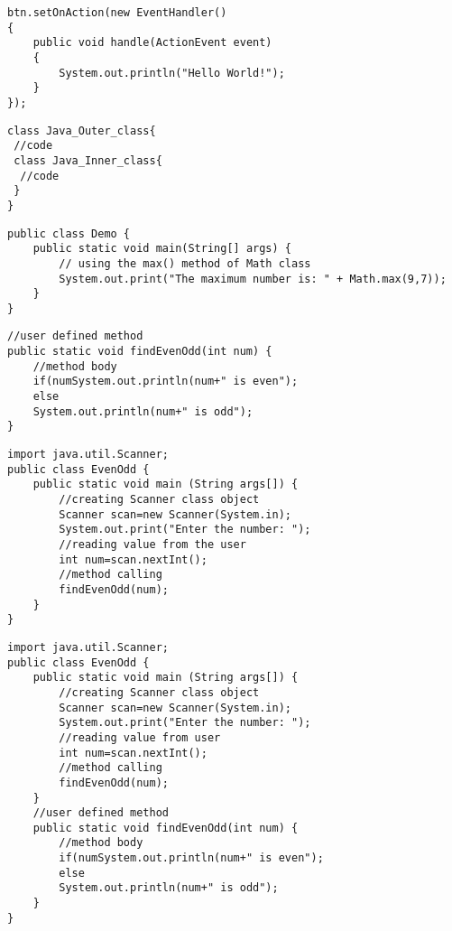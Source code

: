 \documentclass{book}
\def\lthtmlcheckvsize{\ifdim\ht\sizebox<\vsize 
  \ifdim\wd\sizebox<\hsize\expandafter\hfill\fi \expandafter\vfill
  \else\expandafter\vss\fi}%
\begin{document}
{\newpage\clearpage
{}%
\begin{lstlisting}
btn.setOnAction(new EventHandler()
{
    public void handle(ActionEvent event)
    {
        System.out.println("Hello World!");
    }
});
\end{lstlisting}%
\lthtmlfigureZ
\lthtmlcheckvsize\clearpage}

{\newpage\clearpage
{}%
\begin{lstlisting}
class Java_Outer_class{  
 //code  
 class Java_Inner_class{  
  //code  
 }  
}  
\end{lstlisting}%
\lthtmlfigureZ
\lthtmlcheckvsize\clearpage}

{\newpage\clearpage
{}%
\begin{lstlisting}
public class Demo {  
	public static void main(String[] args) {  
		// using the max() method of Math class  
		System.out.print("The maximum number is: " + Math.max(9,7));  
	}  
}  
\end{lstlisting}%
\lthtmlfigureZ
\lthtmlcheckvsize\clearpage}

{\newpage\clearpage
{}%
\begin{lstlisting}
//user defined method  
public static void findEvenOdd(int num) {  
	//method body  
	if(numSystem.out.println(num+" is even");   
	else   
	System.out.println(num+" is odd");  
}  
\end{lstlisting}%
\lthtmlfigureZ
\lthtmlcheckvsize\clearpage}

{\newpage\clearpage
{}%
\begin{lstlisting}
import java.util.Scanner;  
public class EvenOdd {  
	public static void main (String args[]) {  
		//creating Scanner class object     
		Scanner scan=new Scanner(System.in);  
		System.out.print("Enter the number: ");  
		//reading value from the user  
		int num=scan.nextInt();  
		//method calling  
		findEvenOdd(num);  
	}
}  
\end{lstlisting}%
\lthtmlfigureZ
\lthtmlcheckvsize\clearpage}

{\newpage\clearpage
{}%
\begin{lstlisting}
import java.util.Scanner;  
public class EvenOdd {  
	public static void main (String args[]) {  
		//creating Scanner class object     
		Scanner scan=new Scanner(System.in);  
		System.out.print("Enter the number: ");  
		//reading value from user  
		int num=scan.nextInt();  
		//method calling  
		findEvenOdd(num);  
	}  
	//user defined method  
	public static void findEvenOdd(int num) {  
		//method body  
		if(numSystem.out.println(num+" is even");   
		else   
		System.out.println(num+" is odd");  
	}  
}  
\end{lstlisting}%
\lthtmlfigureZ
\lthtmlcheckvsize\clearpage}
\end{document}
